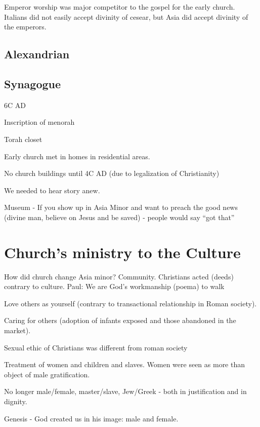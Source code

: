 \documentclass[
]{book}
\begin{document}
Emperor worship was major competitor to the gospel for the early church. Italians did not easily accept divinity of cesear, but Asia did accept divinity of the emperors.

\hypertarget{alexandrian}{%
\subsection{Alexandrian}\label{alexandrian}}

\hypertarget{synagogue}{%
\subsection{Synagogue}\label{synagogue}}

6C AD

Inscription of menorah

Torah closet

Early church met in homes in residential areas.

No church buildings until 4C AD (due to legalization of Christianity)

We needed to hear story anew.

Museum - If you show up in Asia Minor and want to preach the good news (divine man, believe on Jesus and be saved) - people would say ``got that''

\hypertarget{churchs-ministry-to-the-culture}{%
\section{Church's ministry to the Culture}\label{churchs-ministry-to-the-culture}}

How did church change Asia minor? Community. Christians acted (deeds) contrary to culture. Paul: We are God's workmanship (poema) to walk

Love others as yourself (contrary to transactional relationship in Roman society).

Caring for others (adoption of infants exposed and those abandoned in the market).

Sexual ethic of Christians was different from roman society

Treatment of women and children and slaves. Women were seen as more than object of male gratification.

No longer male/female, master/slave, Jew/Greek - both in justification and in dignity.

Genesis - God created us in his image: male and female.
\end{document}
